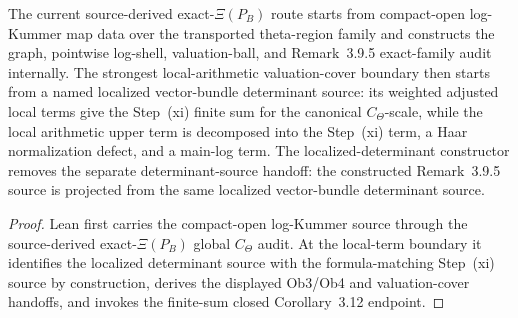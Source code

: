 \begin{proposition}
  \label{prop:localized-step-xi-ctheta-source}
  \leanok
  The current source-derived exact-\(\Xi(P_B)\) route starts from compact-open
  log-Kummer map data over the transported theta-region family and constructs
  the graph, pointwise log-shell, valuation-ball, and Remark~3.9.5
  exact-family audit internally.  The strongest local-arithmetic
  valuation-cover boundary then starts from a named localized vector-bundle
  determinant source: its weighted adjusted local terms give the Step~(xi)
  finite sum for the canonical \(C_\Theta\)-scale, while the local arithmetic
  upper term is decomposed into the Step~(xi) term, a Haar normalization
  defect, and a main-log term.  The localized-determinant constructor removes
  the separate determinant-source handoff: the constructed Remark~3.9.5 source
  is projected from the same localized vector-bundle determinant source.
\end{proposition}

\begin{proof}
  Lean first carries the compact-open log-Kummer source through the
  source-derived exact-\(\Xi(P_B)\) global \(C_\Theta\) audit.  At the
  local-term boundary it identifies the localized determinant source with the
  formula-matching Step~(xi) source by construction, derives the displayed
  Ob3/Ob4 and valuation-cover handoffs, and invokes the finite-sum closed
  Corollary~3.12 endpoint.
\end{proof}
